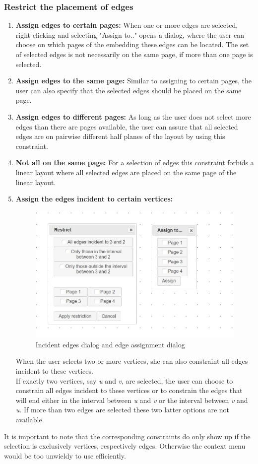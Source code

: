 \subsubsection{Restrict the placement of edges}
\label{edgeRestr}
\begin{enumerate}
\item \textbf{Assign edges to certain pages:} 
When one or more edges are selected, right-clicking and selecting "Assign to.." opens a dialog, where the user can choose on which pages of the embedding these edges can be located. The set of selected edges is not necessarily on the same page, if more than one page is selected.  
\item \textbf{Assign edges to the same page:} Similar to assigning to certain pages, the user can also specify that the selected edges should be placed on the same page. 
\item \textbf{Assign edges to different pages:}
As long as the user does not select more edges than there are pages available, the user can assure that all selected edges are on pairwise different half planes of the layout by using this constraint.
\item \textbf{Not all on the same page:} For a selection of edges this constraint forbids a linear layout where all selected edges are placed on the same page of the linear layout. 
\item \textbf{Assign the edges incident to certain vertices:}
\begin{figure}
\includegraphics[width=\textwidth]{figures/figIndex/AssignAdj.jpg}
\caption{Incident edges dialog and edge assignment dialog}
\end{figure}
When the user selects two or more vertices, she can also constraint all edges incident to these vertices.\\
If exactly two vertices, say \textit{u} and \textit{v}, are selected, the user can choose to constrain all edges incident to these vertices or to constrain the edges that will end either in the interval between \textit{u} and \textit{v} or the interval between \textit{v} and \textit{u}. If more than two edges are selected these two latter options are not available.\\
\end{enumerate}
It is important to note that the corresponding constraints do only show up if the selection is exclusively vertices, respectively edges. Otherwise the context menu would be too unwieldy to use efficiently. 
